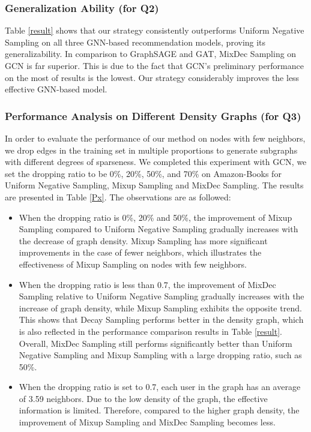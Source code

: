 \subsubsection{\textbf{Generalization Ability (for Q2)}}\label{Q2}
Table \ref{result} shows that our strategy consistently outperforms Uniform Negative Sampling on all three GNN-based recommendation models, proving its generalizability.
In comparison to GraphSAGE and GAT, MixDec Sampling on GCN is far superior. This is due to the fact that GCN's preliminary performance on the most of results is the lowest.
Our strategy considerably improves the less effective GNN-based model.


\subsubsection{\textbf{Performance Analysis on Different Density Graphs (for Q3)}}\label{Q3}
In order to evaluate the performance of our method on nodes with few neighbors, we drop edges in the training set in multiple proportions to generate subgraphs with different degrees of sparseness.
We completed this experiment with GCN, we set the dropping ratio to be 0\%, 20\%, 50\%, and 70\% on Amazon-Books for Uniform Negative Sampling, Mixup Sampling and MixDec Sampling.
The results are presented in Table \ref{Px}. The observations are as followed:
 \begin{itemize}
     \item When the dropping ratio is 0\%, 20\% and 50\%, the improvement of Mixup Sampling compared to Uniform Negative Sampling gradually increases with the decrease of graph density.
     Mixup Sampling has more significant improvements in the case of fewer neighbors, which illustrates the effectiveness of Mixup Sampling on nodes with few neighbors.
     \item When the dropping ratio is less than 0.7, the improvement of MixDec Sampling relative to Uniform Negative Sampling gradually increases with the increase of graph density, while Mixup Sampling exhibits the opposite trend. This shows that Decay Sampling performs better in the density graph, which is also reflected in the performance comparison results in Table \ref{result}. Overall, MixDec Sampling still performs significantly better than Uniform Negative Sampling and Mixup Sampling with a large dropping ratio, such as 50\%.
     \item When the dropping ratio is set to 0.7, each user in the graph has an average of 3.59 neighbors. Due to the low density of the graph, the effective information is limited. Therefore, compared to the higher graph density, the improvement of Mixup Sampling and MixDec Sampling becomes less.
 \end{itemize}
